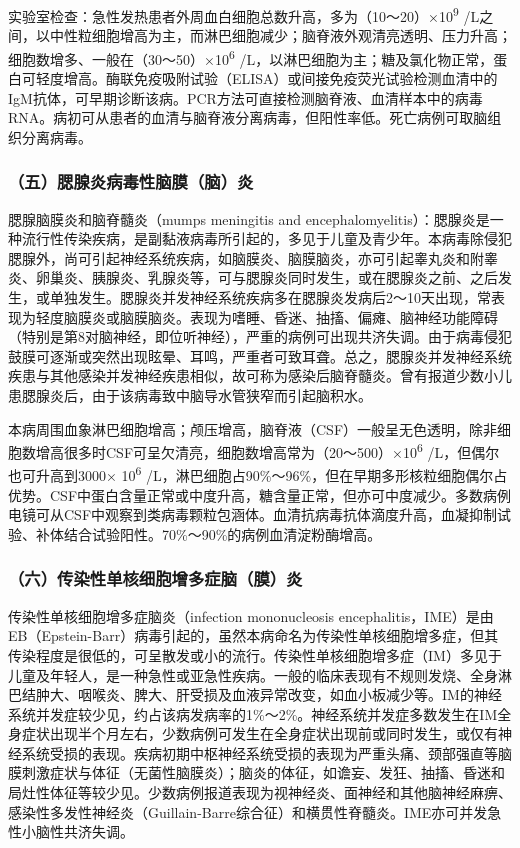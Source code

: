 实验室检查：急性发热患者外周血白细胞总数升高，多为（10～20）×10\textsuperscript{9}
/L之间，以中性粒细胞增高为主，而淋巴细胞减少；脑脊液外观清亮透明、压力升高；细胞数增多、一般在（30～50）×10\textsuperscript{6}
/L，以淋巴细胞为主；糖及氯化物正常，蛋白可轻度增高。酶联免疫吸附试验（ELISA）或间接免疫荧光试验检测血清中的IgM抗体，可早期诊断该病。PCR方法可直接检测脑脊液、血清样本中的病毒RNA。病初可从患者的血清与脑脊液分离病毒，但阳性率低。死亡病例可取脑组织分离病毒。

\subsubsection{（五）腮腺炎病毒性脑膜（脑）炎}

腮腺脑膜炎和脑脊髓炎（mumps meningitis and
encephalomyelitis）：腮腺炎是一种流行性传染疾病，是副黏液病毒所引起的，多见于儿童及青少年。本病毒除侵犯腮腺外，尚可引起神经系统疾病，如脑膜炎、脑膜脑炎，亦可引起睾丸炎和附睾炎、卵巢炎、胰腺炎、乳腺炎等，可与腮腺炎同时发生，或在腮腺炎之前、之后发生，或单独发生。腮腺炎并发神经系统疾病多在腮腺炎发病后2～10天出现，常表现为轻度脑膜炎或脑膜脑炎。表现为嗜睡、昏迷、抽搐、偏瘫、脑神经功能障碍（特别是第8对脑神经，即位听神经），严重的病例可出现共济失调。由于病毒侵犯鼓膜可逐渐或突然出现眩晕、耳鸣，严重者可致耳聋。总之，腮腺炎并发神经系统疾患与其他感染并发神经疾患相似，故可称为感染后脑脊髓炎。曾有报道少数小儿患腮腺炎后，由于该病毒致中脑导水管狭窄而引起脑积水。

本病周围血象淋巴细胞增高；颅压增高，脑脊液（CSF）一般呈无色透明，除非细胞数增高很多时CSF可呈欠清亮，细胞数增高常为（20～500）×10\textsuperscript{6}
/L，但偶尔也可升高到3000× 10\textsuperscript{6}
/L，淋巴细胞占90\%～96\%，但在早期多形核粒细胞偶尔占优势。CSF中蛋白含量正常或中度升高，糖含量正常，但亦可中度减少。多数病例电镜可从CSF中观察到类病毒颗粒包涵体。血清抗病毒抗体滴度升高，血凝抑制试验、补体结合试验阳性。70\%～90\%的病例血清淀粉酶增高。

\subsubsection{（六）传染性单核细胞增多症脑（膜）炎}

传染性单核细胞增多症脑炎（infection mononucleosis
encephalitis，IME）是由EB（Epstein-Barr）病毒引起的，虽然本病命名为传染性单核细胞增多症，但其传染程度是很低的，可呈散发或小的流行。传染性单核细胞增多症（IM）多见于儿童及年轻人，是一种急性或亚急性疾病。一般的临床表现有不规则发烧、全身淋巴结肿大、咽喉炎、脾大、肝受损及血液异常改变，如血小板减少等。IM的神经系统并发症较少见，约占该病发病率的1\%～2\%。神经系统并发症多数发生在IM全身症状出现半个月左右，少数病例可发生在全身症状出现前或同时发生，或仅有神经系统受损的表现。疾病初期中枢神经系统受损的表现为严重头痛、颈部强直等脑膜刺激症状与体征（无菌性脑膜炎）；脑炎的体征，如谵妄、发狂、抽搐、昏迷和局灶性体征等较少见。少数病例报道表现为视神经炎、面神经和其他脑神经麻痹、感染性多发性神经炎（Guillain-Barre综合征）和横贯性脊髓炎。IME亦可并发急性小脑性共济失调。

